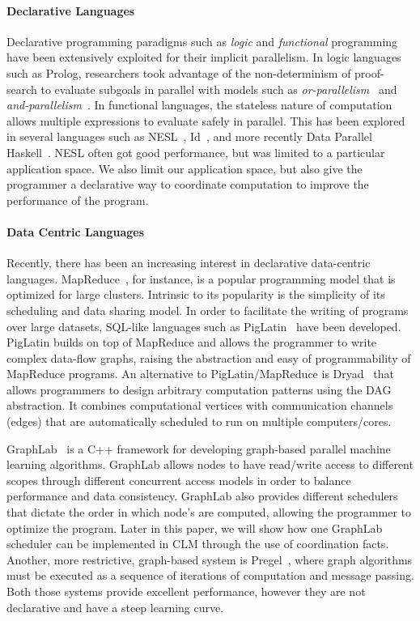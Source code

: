 
\paragraph{Declarative Languages}
Declarative programming paradigms such as \emph{logic} and \emph{functional}
programming have been extensively exploited for their implicit parallelism.
In logic languages such as Prolog, researchers took advantage of the
non-determinism of proof-search to evaluate subgoals in parallel with models
such as \emph{or-parallelism}~\cite{ali-86} and
\emph{and-parallelism}~\cite{Shen-92}.  In functional languages, the stateless
nature of computation allows multiple expressions to evaluate safely in
parallel. This has been explored in several languages such as
NESL~\cite{Blelloch:1996:PPA:227234.227246}, Id~\cite{Nikhil93anoverview}, and
more recently Data Parallel Haskell~\cite{nepal}.
NESL often got good performance, but was limited to a particular
application space. We also limit our application space, but also give the
programmer a declarative way to coordinate computation to improve the
performance of the program.

\paragraph{Data Centric Languages}
Recently, there has been an increasing interest in declarative data-centric
languages. MapReduce~\cite{Dean:2008:MSD:1327452.1327492}, for instance, is a
popular programming model that is optimized for large clusters.
Intrinsic to its popularity is the simplicity of its scheduling and data sharing
model.  In order to facilitate the writing of programs over large datasets,
SQL-like languages such as PigLatin~\cite{Olston:2008:PLN:1376616.1376726} have
been developed.  PigLatin builds on top of MapReduce and allows the programmer
to write complex data-flow graphs, raising the abstraction and easy of
programmability of MapReduce programs.  An alternative to PigLatin/MapReduce is
Dryad~\cite{Isard:2007:DDD:1272996.1273005} that allows programmers to design
arbitrary computation patterns using the DAG abstraction. It combines
computational vertices with communication channels (edges) that are
automatically scheduled to run on multiple computers/cores.

GraphLab~\cite{GraphLab2010} is a C++ framework for developing graph-based parallel machine
learning algorithms. GraphLab allows nodes to have read/write access to
different scopes through different concurrent access models in order to balance
performance and data consistency.  GraphLab also provides different schedulers
that dictate the order in which node's are computed, allowing the programmer to
optimize the program. Later in this paper, we will show how one GraphLab
scheduler can be implemented in CLM through the use of coordination facts.
Another, more restrictive, graph-based system is
Pregel~\cite{Malewicz:2010:PSL:1807167.1807184}, where graph algorithms must be
executed as a sequence of iterations of computation and message passing.
Both those systems provide excellent performance, however they are not
declarative and have a steep learning curve.

